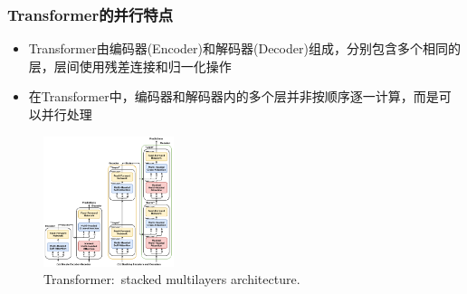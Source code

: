 \begin{frame}
	\frametitle{\textrm{Transformer}的并行特点}
\begin{itemize}
	\item \textrm{Transformer}由编码器\textrm{(Encoder)}和解码器\textrm{(Decoder)}组成，分别包含多个相同的层，层间使用残差连接和归一化操作\\
    {\fontsize{7.2pt}{6.2pt}\selectfont{这样的模块设计，为并行计算提供了基础}}
    \item 在\textrm{Transformer}中，编码器和解码器内的多个层并非按顺序逐一计算，而是可以并行处理\\
	    {\fontsize{7.2pt}{6.2pt}\selectfont{在编码器中每个编码器层相互独立，在计算时，所有编码器层可以同时处理输入数据的不同部分，大幅提升计算效率}}
\end{itemize}
\begin{figure}[h!]
\vspace*{-0.05in}
\centering
\includegraphics[height=1.5in, width=1.5in, viewport=0 0 1426 1430,clip]{Figures/Transformer_stacked_multilayers.png}
\caption{\tiny \textrm{Transformer:~stacked multilayers architecture.}}%
\label{Transformer_stacked_multilayers}
\end{figure}
\end{frame}

